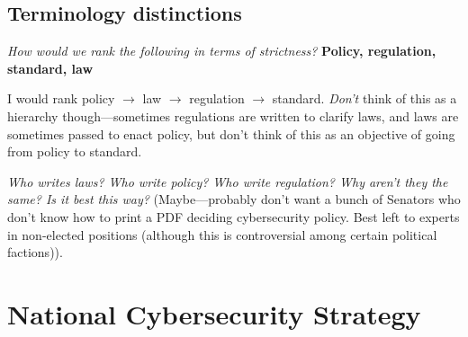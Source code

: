 \documentclass[11pt]{article}
\begin{document}
\subsection{Terminology distinctions}

{\it How would we rank the following in terms of strictness?} {\bf Policy, regulation, standard, law}

I would rank policy $\rightarrow$ law $\rightarrow$ regulation $\rightarrow$ standard.
{\it Don't} think of this as a hierarchy though---sometimes regulations are written to clarify laws, and laws are sometimes passed to enact policy, but don't think of this as an objective of going from policy to standard.


{\it Who writes laws? Who write policy? Who write regulation? Why aren't they the same? Is it best this way?} (Maybe---probably don't want a bunch of Senators who don't know how to print a PDF deciding cybersecurity policy. Best left to experts in non-elected positions (although this is controversial among certain political factions)).



\section{National Cybersecurity Strategy}
\end{document}

